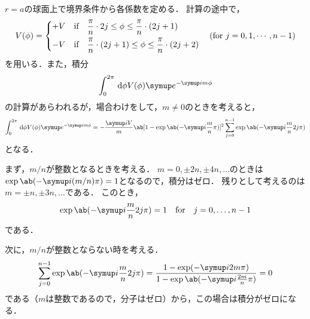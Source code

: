 \begin{enumerate}[%
  label=%
  \fbox{%
   {\thesection.\arabic*}%
    },%
    ]
\begin{enumerate}[(a)]
\begin{gather}
        \end{gather}
        $r=a$の球面上で境界条件から各係数を定める．
        計算の途中で，
        \begin{gather}
          V(\phi) = \left\{
            \begin{aligned}
              +V &\hspace{1em} \text{if}\hspace{1em} \frac{\pi}{n}\cdot 2j \leq \phi \leq \frac{\pi}{n}\cdot(2j+1)\\
              -V &\hspace{1em} \text{if}\hspace{1em} \frac{\pi}{n}\cdot (2j+1) \leq \phi \leq \frac{\pi}{n}\cdot(2j+2)\\
            \end{aligned}
          \right. \hspace{1em} (\text{for}\ j = 0, 1, \cdots, n-1)
        \end{gather}
        を用いる．また，積分
        \begin{gather}
          \int_0^{2\pi} \dl{\phi} V(\phi) \e^{-\i m\phi}
        \end{gather}
        の計算があらわれるが，場合わけをして，$m \neq 0$のときを考えると，
        \begin{gather}
          \int_0^{2\pi} \dl{\phi} V(\phi) \e^{-\i m\phi} =%
          -\frac{\i V}{m}\ab[1 - \exp\ab(-\i \frac{m}{n}\pi)]^2 %
          \sum_{j=0}^{n-1} \exp\ab(-\i\frac{m}{n}2j\pi)
        \end{gather}
        となる．

        まず，$m / n$が整数となるときを考える．
        $m = 0, \pm 2n, \pm 4n, \ldots$のときは
        $\exp\ab(-\i(m/n)\pi) = 1$となるので，積分はゼロ．
        残りとして考えるのは$m = \pm n, \pm 3n, \ldots$である．
        このとき，
        \begin{gather}
          \exp\ab(-\i \frac{m}{n}2j \pi) = 1 \qq \text{for}\qq j = 0, \ldots, n-1
        \end{gather}
        である．

        次に，$m / n$が整数とならない時を考える．
        \begin{gather}
          \sum_{j=0}^{n-1} \exp\ab(-\i \frac{m}{n}2j\pi) %
          = \frac{1 - \exp(-\i 2m\pi)}{1 - \exp\ab(-\i \frac{2m}{n}\pi)} = 0
        \end{gather}
        である（$m$は整数であるので，分子はゼロ）から，この場合は積分がゼロになる．


\end{enumerate}
\end{enumerate}
